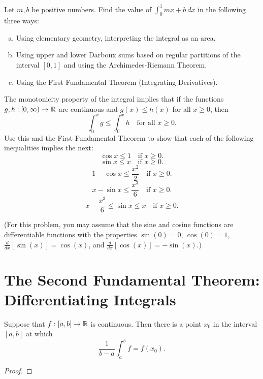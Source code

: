 \documentclass[letterpaper, twoside, 12pt]{book}
\begin{document}
\begin{exercise}[1]
  Let \(m,b\) be positive numbers. Find the value of \(\int_0^1 mx+b ~dx\)
  in the following three ways:
  \begin{enumerate}[(a)]
    \item Using elementary geometry, interpreting the integral as an area.
    \item Using upper and lower Darboux sums based on regular partitions of
      the interval \([0,1]\) and using the Archimedes-Riemann Theorem.
    \item Using the First Fundamental Theorem (Integrating Derivatives).
  \end{enumerate}
\end{exercise}
\begin{solution}

\end{solution}


\begin{exercise}[5]
  The monotonicity property of the integral implies that if the functions
  \(g,h:[0,\infty)\to\mathbb R\) are continuous and \(g(x)\leq h(x)\) for all
  \(x\geq 0\), then
  \[
    \int_0^x g\leq \int_0^x h
    \text{~~ for all~} x\geq 0
  .\]
  Use this and the First Fundamental Theorem to show that each of the following
  inequalities implies the next:
  \[
    \cos x \leq 1
    \text{~~ if~} x\geq 0
  .\]
  \[
    \sin x \leq x
    \text{~~ if~} x\geq 0
  .\]
  \[
    1-\cos x \leq \frac{x^2}{2}
    \text{~~ if~} x\geq 0
  .\]
  \[
    x-\sin x \leq \frac{x^3}{6}
    \text{~~ if~} x\geq 0
  .\]
  \[
    x-\frac{x^3}{6} \leq \sin x \leq x
    \text{~~ if~} x\geq 0
  .\]

  (For this problem, you may assume that the sine and cosine functions
  are differentiable functions with the properties
  \(\sin(0)=0\), \(\cos(0)=1\), \(\frac{d}{dx}[\sin(x)]=\cos(x)\),
  and \(\frac{d}{dx}[\cos(x)]=-\sin(x)\).)
\end{exercise}
\begin{solution}

\end{solution}




\section{The Second Fundamental Theorem: Differentiating Integrals}


\begin{theorem}
  Suppose that \(f:[a,b]\to\mathbb R\) is continuous. Then there is a point \(x_0\)
  in the interval \([a,b]\) at which
  \[
    \frac{1}{b-a}\int_a^b f
      =
    f(x_0)
  .\]
\end{theorem}
\begin{proof}

\end{proof}
\end{document}
